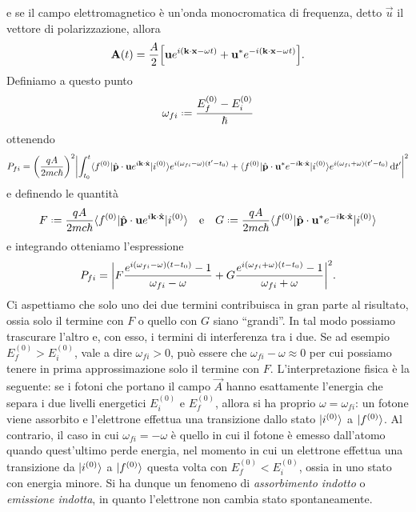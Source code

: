 e se il campo elettromagnetico è un'onda monocromatica di frequenza, detto $\vec u$ il vettore di polarizzazione, allora
\begin{equation}
	\vec A(t)=\frac{A}2\Big[\vec u e^{i(\scalar{\vec k}{\vec x}-\omega t)}+\vec u^*e^{-i(\scalar{\vec k}{\vec x}-\omega t)}\Big].
	\label{eq:campo-elettromagnetico-monocromatico}
\end{equation}
Definiamo a questo punto
\begin{equation}
	\omega_{fi}\defeq\frac{E_f^{(0)}-E_i^{(0)}}{\hbar}
	\label{eq:frequenza-transizione}
\end{equation}
ottenendo
\begin{equation}
    P_{fi}=\bigg(\frac{qA}{2mc\hbar}\bigg)^2\abs[\bigg]{\int_{t_0}^t
		\bra{f^{(0)}}\scalar{\op{\vec p}}{\vec u}e^{i\scalar{\vec k}{\op{\vec x}}}\ket{i^{(0)}}e^{i(\omega_{fi}-\omega)(t'-t_0)}+
		\bra{f^{(0)}}\scalar{\op{\vec p}}{\vec u^*}e^{-i\scalar{\vec k}{\op{\vec x}}}\ket{i^{(0)}}e^{i(\omega_{fi}+\omega)(t'-t_0)}
	\,\dd t'}^2
\end{equation}
e definendo le quantità
\begin{equation}
	F\defeq\frac{qA}{2mc\hbar}\bra{f^{(0)}}\scalar{\op{\vec p}}{\vec u}e^{i\scalar{\vec k}{\op{\vec x}}}\ket{i^{(0)}}
	\qeq
	G\defeq\frac{qA}{2mc\hbar}\bra{f^{(0)}}\scalar{\op{\vec p}}{\vec u^*}e^{-i\scalar{\vec k}{\op{\vec x}}}\ket{i^{(0)}}
\end{equation}
e integrando otteniamo l'espressione
\begin{equation}
    P_{fi}=\abs[\bigg]{F\frac{e^{i(\omega_{fi}-\omega)(t-t_0)}-1}{\omega_{fi}-\omega}+G\frac{e^{i(\omega_{fi}+\omega)(t-t_0)}-1}{\omega_{fi}+\omega}}^2.
\end{equation}
Ci aspettiamo che solo uno dei due termini contribuisca in gran parte al risultato, ossia solo il termine con $F$ o quello con $G$ siano ``grandi''.
In tal modo possiamo trascurare l'altro e, con esso, i termini di interferenza tra i due.
Se ad esempio $E_f^{(0)}>E_i^{(0)}$, vale a dire $\omega_{fi}>0$, può essere che $\omega_{fi}-\omega\approx 0$ per cui possiamo tenere in prima approssimazione solo il termine con $F$.
L'interpretazione fisica è la seguente: se i fotoni che portano il campo $\vec A$ hanno esattamente l'energia che separa i due livelli energetici $E_i^{(0)}$ e $E_f^{(0)}$, allora si ha proprio $\omega=\omega_{fi}$: un fotone viene assorbito e l'elettrone effettua una transizione dallo stato $\ket{i^{(0)}}$ a $\ket{f^{(0)}}$.
Al contrario, il caso in cui $\omega_{fi}=-\omega$ è quello in cui il fotone è emesso dall'atomo quando quest'ultimo perde energia, nel momento in cui un elettrone effettua una transizione da $\ket{i^{(0)}}$ a $\ket{f^{(0)}}$ questa volta con $E_f^{(0)}<E_i^{(0)}$, ossia in uno stato con energia minore.
Si ha dunque un fenomeno di \emph{assorbimento indotto} o \emph{emissione indotta}, in quanto l'elettrone non cambia stato spontaneamente.

